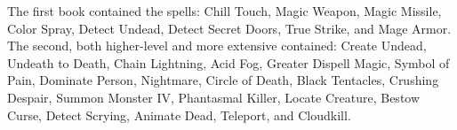 \documentclass[letterpaper]{article}
\begin{document}
\noindent The first book contained the spells: Chill Touch, Magic Weapon, Magic Missile, Color Spray, Detect Undead, Detect Secret Doors, True Strike, and Mage Armor.  The second, both higher-level and more extensive contained: Create Undead, Undeath to Death, Chain Lightning, Acid Fog, Greater Dispell Magic, Symbol of Pain, Dominate Person, Nightmare, Circle of Death, Black Tentacles, Crushing Despair, Summon Monster IV, Phantasmal Killer, Locate Creature, Bestow Curse, Detect Scrying, Animate Dead, Teleport, and Cloudkill.\\
\end{document}

